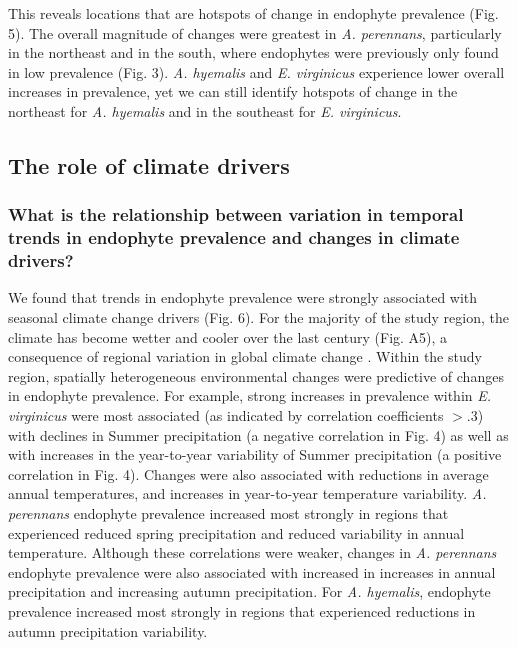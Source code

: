\documentclass[11pt]{article}
\begin{document}
This reveals locations that are hotspots of change in endophyte prevalence (Fig. 5). 
The overall magnitude of changes were greatest in \emph{A. perennans}, particularly in the northeast and in the south, where endophytes were previously only found in low prevalence (Fig. 3).
\emph{A. hyemalis} and \emph{E. virginicus} experience lower overall increases in prevalence, yet we can still identify hotspots of change in the northeast for \emph{A. hyemalis} and in the southeast for \emph{E. virginicus}.

\subsection*{The role of climate drivers}
\subsubsection*{What is the relationship between variation in temporal trends in endophyte prevalence and changes in climate drivers?}

We found that trends in endophyte prevalence were strongly associated with seasonal climate change drivers (Fig. 6).
For the majority of the study region, the climate has become wetter and cooler over the last century (Fig. A5), a consequence of regional variation in global climate change \cite{ipcc_2021}. 
Within the study region, spatially heterogeneous environmental changes were predictive of changes in endophyte prevalence. 
For example, strong increases in prevalence within \emph{E. virginicus} were most associated (as indicated by correlation coefficients $>.3$) with declines in Summer precipitation  (a negative correlation in Fig. 4) as well as with increases in the year-to-year variability of Summer precipitation (a positive correlation in Fig. 4). 
Changes were also associated with reductions in average annual temperatures, and increases in year-to-year temperature variability.
\emph{A. perennans} endophyte prevalence increased most strongly in regions that experienced reduced spring precipitation and reduced variability in annual temperature.
Although these correlations were weaker, changes in \emph{A. perennans} endophyte prevalence were also associated with increased in increases in annual precipitation and increasing autumn precipitation. 
For \emph{A. hyemalis}, endophyte prevalence increased most strongly in regions that experienced reductions in autumn precipitation variability. 
\end{document}
